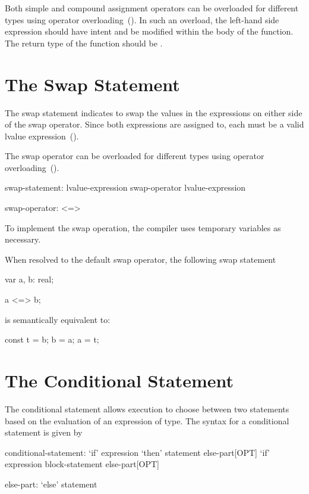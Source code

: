Both simple and compound assignment operators can be overloaded for different
types using operator overloading~().
In such an overload, the left-hand side expression should have
 intent and be modified within the body of the function.  The return
type of the function should be .

\section{The Swap Statement}
\label{The_Swap_Statement}

The swap statement indicates to swap the values in the expressions
on either side of the swap operator.  Since both expressions are assigned
to, each must be a valid lvalue expression~().

The swap operator can be overloaded for different types using operator
overloading~().
\begin{syntax}
swap-statement:
  lvalue-expression swap-operator lvalue-expression

swap-operator:
  <=>
\end{syntax}

To implement the swap operation, the compiler uses temporary variables
as necessary.

\begin{example}
When resolved to the default swap operator, the following swap statement
\begin{chapel}
var a, b: real;

a <=> b;
\end{chapel}
is semantically equivalent to:
\begin{chapel}
const t = b;
b = a;
a = t;
\end{chapel}
\end{example}

\section{The Conditional Statement}
\label{The_Conditional_Statement}

The conditional statement allows execution to choose between two
statements based on the evaluation of an expression of 
type. The syntax for a conditional statement is given by
\begin{syntax}
conditional-statement:
  `if' expression `then' statement else-part[OPT]
  `if' expression block-statement else-part[OPT]

else-part:
  `else' statement
\end{syntax}

